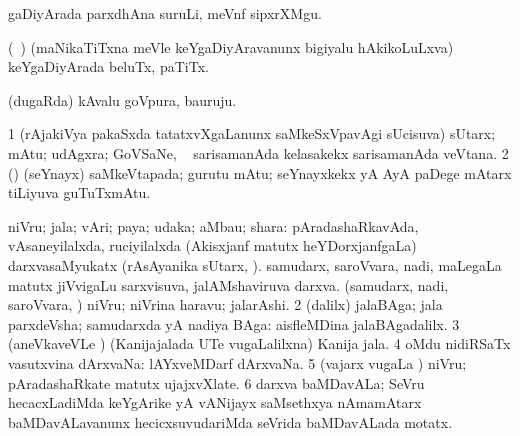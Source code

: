 \bentry
{} 
\gl{\nA}
\expl{}
\bmng
gaDiyArada parxdhAna suruLi, meVnf sipxrXMgu. 
\emng
\eentry

\bentry
{} 
\gl{\nA}
\expl{}
\bmng
(\kanmu\ \birx) (maNikaTiTxna meVle keYgaDiyAravanunx bigiyalu hAkikoLuLxva) keYgaDiyArada beluTx, paTiTx. 
\emng
\eentry

\bentry
{} 
\gl{\nA}
\expl{}
\bmng
(dugaRda) kAvalu goVpura, bauruju. 
\emng
\eentry

\bentry
{} 
\gl{\nA}
\expl{}
\bmng
\bnum
\num{1} (rAjakiVya pakaSxda tatatxvXgaLanunx saMkeSxVpavAgi sUcisuva) sUtarx; mAtu; udAgxra; GoVSaNe, \udA\  sarisamanAda kelasakekx sarisamanAda veVtana. 
\num{2} (\ca) (seYnayx) saMkeVtapada; gurutu mAtu; seYnayxkekx yA AyA paDege mAtarx tiLiyuva guTuTxmAtu. 
\enum
\emng
\eentry

\bentry
{} 
\gl{\nA}
\expl{}
\bmng
\bnum
{} niVru; jala; vAri; paya; udaka; aMbau; shara: 
\banum
{} pAradashaRkavAda, vAsaneyilalxda, ruciyilalxda (Akisxjanf matutx heYDorxjanfgaLa) darxvasaMyukatx (rAsAyanika sUtarx, ). 
 samudarx, saroVvara, nadi, maLegaLa matutx jiVvigaLu sarxvisuva, jalAMshaviruva darxva. 
 (samudarx, nadi, saroVvara, \mo) niVru; niVrina haravu; jalarAshi. 
\eanum
\numie
\num{2} (\bava dalilx) jalaBAga; jala parxdeVsha; samudarxda yA nadiya BAga:  aisfleMDina jalaBAgadalilx. 
\num{3} (aneVkaveVLe ) (Kanijajalada UTe \mo vugaLalilxna) Kanija jala. 
\num{4} oMdu nidiRSaTx vasutxvina dArxvaNa:  lAYxveMDarf dArxvaNa. 
\num{5} (vajarx \mo vugaLa \vi) niVru; pAradashaRkate matutx ujajxvXlate. 
\num{6} darxva baMDavALa; SeVru hecacxLadiMda keYgArike yA vANijayx saMsethxya nAmamAtarx baMDavALavanunx hecicxsuvudariMda seVrida baMDavALada motatx. 
\enum
\emng

